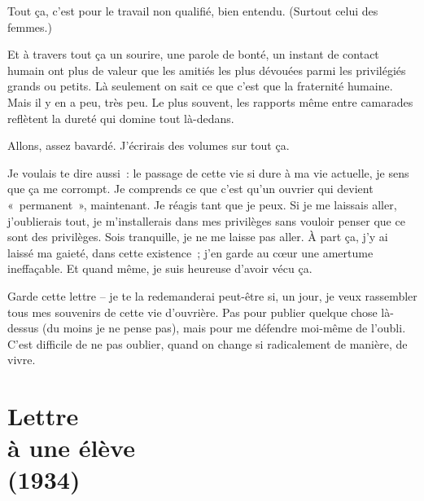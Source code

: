 \documentclass[french,twoside]{book} %
\newcommand{\signed}[1]{\bigbreak\filbreak{\raggedleft #1\par}\medskip}
\begin{document}
Tout ça, c'est pour le travail non qualifié, bien entendu. (Surtout celui des femmes.)\par
Et à travers tout ça un sourire, une parole de bonté, un instant de contact humain ont plus de valeur que les amitiés les plus dévouées parmi les privilégiés grands ou petits. Là seulement on sait ce que c'est que la fraternité humaine. Mais il y en a peu, très peu. Le plus souvent, les rapports même entre camarades reflètent la dureté qui domine tout là-dedans.\par
Allons, assez bavardé. J'écrirais des volumes sur tout ça.\par


\signed{S. W.}
\noindent Je voulais te dire aussi : le passage de cette vie si dure à ma vie actuelle, je sens que ça me corrompt. Je comprends ce que c'est qu'un ouvrier qui devient « permanent », maintenant. Je réagis tant que je peux. Si je me laissais aller, j'oublierais tout, je m'installerais dans mes privilèges sans vouloir penser que ce sont des privilèges. Sois tranquille, je ne me laisse pas aller. À part ça, j'y ai laissé ma gaieté, dans cette existence ; j'en garde au cœur une amertume ineffaçable. Et quand même, je suis heureuse d'avoir vécu ça.\par
Garde cette lettre – je te la redemanderai peut-être si, un jour, je veux rassembler tous mes souvenirs de cette vie d'ouvrière. Pas pour publier quelque chose là-dessus (du moins je ne pense pas), mais pour me défendre moi-même de l'oubli. C'est difficile de ne pas oublier, quand on change si radicalement de manière, de vivre.
\section[Lettre, à une élève, (1934)]{Lettre \\
à une élève \\
(1934)}\renewcommand{\leftmark}{Lettre \\
à une élève \\
(1934)}
\end{document}
